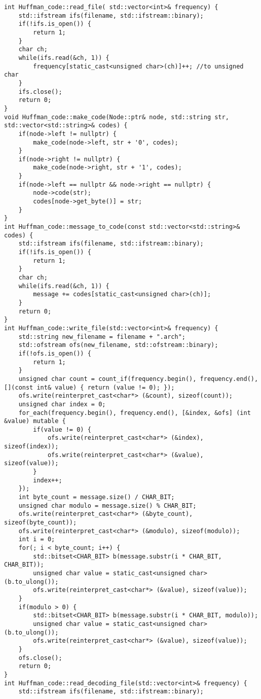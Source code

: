 \begin{verbatim}
int Huffman_code::read_file( std::vector<int>& frequency) {
    std::ifstream ifs(filename, std::ifstream::binary);
    if(!ifs.is_open()) {
        return 1;
    }
    char ch;
    while(ifs.read(&ch, 1)) {
        frequency[static_cast<unsigned char>(ch)]++; //to unsigned char
    }
    ifs.close();
    return 0;
}
void Huffman_code::make_code(Node::ptr& node, std::string str, std::vector<std::string>& codes) {
    if(node->left != nullptr) {
        make_code(node->left, str + '0', codes);
    }
    if(node->right != nullptr) {
        make_code(node->right, str + '1', codes);
    }
    if(node->left == nullptr && node->right == nullptr) {
        node->code(str);
        codes[node->get_byte()] = str;
    }
}
int Huffman_code::message_to_code(const std::vector<std::string>& codes) {
    std::ifstream ifs(filename, std::ifstream::binary);
    if(!ifs.is_open()) {
        return 1;
    }
    char ch;
    while(ifs.read(&ch, 1)) {
        message += codes[static_cast<unsigned char>(ch)];
    }
    return 0;
}
int Huffman_code::write_file(std::vector<int>& frequency) {
    std::string new_filename = filename + ".arch";
    std::ofstream ofs(new_filename, std::ofstream::binary);
    if(!ofs.is_open()) {
        return 1;
    }
    unsigned char count = count_if(frequency.begin(), frequency.end(), [](const int& value) { return (value != 0); });
    ofs.write(reinterpret_cast<char*> (&count), sizeof(count));
    unsigned char index = 0;
    for_each(frequency.begin(), frequency.end(), [&index, &ofs] (int &value) mutable {
        if(value != 0) {
            ofs.write(reinterpret_cast<char*> (&index), sizeof(index));
            ofs.write(reinterpret_cast<char*> (&value), sizeof(value));
        }
        index++;
    });
    int byte_count = message.size() / CHAR_BIT;
    unsigned char modulo = message.size() % CHAR_BIT;
    ofs.write(reinterpret_cast<char*> (&byte_count), sizeof(byte_count));
    ofs.write(reinterpret_cast<char*> (&modulo), sizeof(modulo));
    int i = 0;
    for(; i < byte_count; i++) {
        std::bitset<CHAR_BIT> b(message.substr(i * CHAR_BIT, CHAR_BIT));
        unsigned char value = static_cast<unsigned char>(b.to_ulong());
        ofs.write(reinterpret_cast<char*> (&value), sizeof(value));
    }
    if(modulo > 0) {
        std::bitset<CHAR_BIT> b(message.substr(i * CHAR_BIT, modulo));
        unsigned char value = static_cast<unsigned char>(b.to_ulong());
        ofs.write(reinterpret_cast<char*> (&value), sizeof(value));
    }
    ofs.close();
    return 0;
}
int Huffman_code::read_decoding_file(std::vector<int>& frequency) {
    std::ifstream ifs(filename, std::ifstream::binary);

\end{verbatim}
